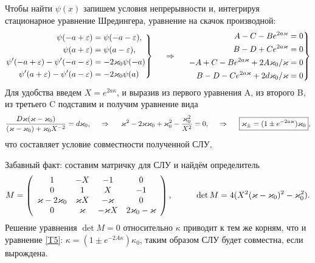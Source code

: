 Чтобы найти $\psi(x)$ запишем условия непрерывности и, интегрируя стационарное уравнение Шредингера, уравнение на скачок производной:
\begin{equation*}
    \left.\begin{aligned}
        \psi(-a+\varepsilon) &= \psi(-a-\varepsilon), \\
        \psi(a+\varepsilon) &= \psi(a-\varepsilon), \\
        \psi'(-a+\varepsilon) - \psi'(-a-\varepsilon) &= -2 \kappa_0 \psi(-a) \\
        \psi'(a+\varepsilon) - \psi'(a-\varepsilon) &= -2 \kappa_0 \psi(a) 
    \end{aligned}\right\}
    \hspace{0.5cm} \Rightarrow \hspace{0.5cm}
    \left.\begin{aligned}
        A - C - B e^{2 a \kappa} = 0 \\
        B - D + C e^{2 a \kappa} = 0 \\
        -A + C - B e^{2 a \kappa} + 2 A \kappa_0/\kappa = 0 \\
        B - D - C e^{2 a \kappa} + 2 d \kappa_0/\kappa = 0 \\
    \end{aligned}\right\}
\end{equation*}
Для удобства введем $X = e^{2 a \kappa}$, и выразив из первого уравнения A, из второго B, из третьего C подставим и получим уравнение вида
\begin{equation}
    \frac{D  \kappa (\kappa-\kappa_0)}{(\kappa-\kappa_0)+\kappa_0 X^{-2}} = d \kappa_0,
    \hspace{0.5cm} \Rightarrow \hspace{0.5cm}
    \kappa ^2-2 \kappa  \kappa_0+\kappa_0^2-\frac{\kappa_0^2}{X^2}=0,
    \hspace{0.5cm} \Rightarrow \hspace{0.5cm}
    \boxed{
    \kappa_{\pm} = (1 \pm e^{-2 a \kappa}) \kappa_0
    },
    \label{T5}
\end{equation}
что составляет условие совместности полученной СЛУ,

Забавный факт: составим матричку для СЛУ и найдём определитель
\begin{equation*}
    M = \left(
    \begin{array}{cccc}
     1 & -X & -1 & 0 \\
     0 & 1 & X & -1 \\
     \kappa -2 \kappa_0 & \kappa  X & -\kappa  & 0 \\
     0 & \kappa  & -\kappa X & 2 \kappa_0-\kappa  \\
    \end{array}
    \right), 
    \hspace{10 mm} \det M = 4 (X^2 (\kappa-\kappa_0)^2-\kappa_0^2).
\end{equation*}
Решение уравнения $\det M = 0$ относительно $\kappa$ приводит к тем же корням, что и уравнение \eqref{T5}: $ \kappa = (1 \pm e^{-2 A \kappa}) \kappa_0$, таким образом СЛУ будет совместна, если вырождена. 

